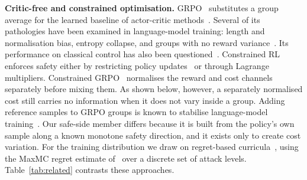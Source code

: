 \documentclass[conference]{IEEEtran}
\begin{document}
\textbf{Critic-free and constrained optimisation.} GRPO~\cite{shao2024deepseekmath,guo2025deepseekr1} substitutes a group average for the learned baseline of actor-critic methods~\cite{schulman2016gae}. Several of its pathologies have been examined in language-model training: length and normalisation bias, entropy collapse, and groups with no reward variance~\cite{liu2025understanding,yu2025dapo,nie2026starvation}. Its performance on classical control has also been questioned~\cite{oliveira2025critics,wang2026gr2po}. Constrained RL enforces safety either by restricting policy updates~\cite{achiam2017cpo} or through Lagrange multipliers. Constrained GRPO~\cite{girgis2026cgrpo} normalises the reward and cost channels separately before mixing them. As shown below, however, a separately normalised cost still carries no information when it does not vary inside a group. Adding reference samples to GRPO groups is known to stabilise language-model training~\cite{yan2025luffy,armor2026}. Our safe-side member differs because it is built from the policy's own sample along a known monotone safety direction, and it exists only to create cost variation. For the training distribution we draw on regret-based curricula~\cite{dennis2020paired,jiang2021plr,parkerholder2022accel,rutherford2024noregrets}, using the MaxMC regret estimate of~\cite{jiang2021robustplr} over a discrete set of attack levels. Table~\ref{tab:related} contrasts these approaches.

\begin{table}[t]
\centering
\caption{Positioning Against the Closest Approaches}
\label{tab:related}
\setlength{\tabcolsep}{2.5pt}
\end{table}
\end{document}
